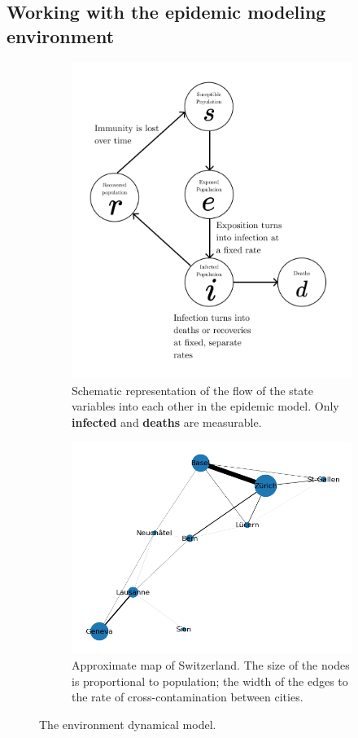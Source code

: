 \documentclass[10pt]{article}
\begin{document}
\subsection*{Working with the epidemic modeling environment}

\begin{figure}[h!]
  \centering
  \begin{subfigure}[t]{.47\textwidth}
    \centering
    \includegraphics[width=.9\textwidth]{figures/seirds.png}
    \caption{Schematic representation of the flow of the state variables into each other in the epidemic model. Only \textbf{infected} and \textbf{deaths} are measurable.}
  \end{subfigure}%
  \hfill
  \begin{subfigure}[t]{.47\textwidth}
    \centering
    \includegraphics[width=.9\textwidth]{figures/switzerland.png}
    \caption{Approximate map of Switzerland. The size of the nodes is proportional to population; the width of the edges to the rate of cross-contamination between cities.}
  \end{subfigure}
  \caption{The environment dynamical model.}
  \label{fig:env}
\end{figure}
\end{document}
